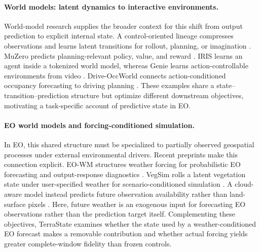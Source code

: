 \documentclass[letterpaper]{article} %
\begin{document}
\paragraph{World models: latent dynamics to interactive environments.}
World-model research supplies the broader context for this shift from output
prediction to explicit internal state. A control-oriented lineage compresses
observations and learns latent transitions for rollout, planning, or imagination
\cite{ha2018worldmodels,hafner2019planet,hafner2020dreamer}. MuZero predicts
planning-relevant policy, value, and reward \cite{schrittwieser2020muzero}. IRIS
learns an agent inside a tokenized world model, whereas Genie learns
action-controllable environments from video
\cite{micheli2023iris,bruce2024genie}. Drive-OccWorld connects
action-conditioned occupancy forecasting to driving planning
\cite{yang2025driveoccworld}. These examples share a
state--transition--prediction structure but optimize different downstream
objectives, motivating a task-specific account of predictive state in EO.

\paragraph{EO world models and forcing-conditioned simulation.}
In EO, this shared structure must be specialized to partially observed
geospatial processes under external environmental drivers. Recent preprints
make this connection explicit. EO-WM structures weather forcing for
probabilistic EO forecasting and output-response diagnostics
\cite{luo2026eowm}. VegSim rolls a latent vegetation state under user-specified
weather for scenario-conditioned simulation \cite{iele2026vegsim}. A
cloud-aware model instead predicts future observation availability rather than
land-surface pixels \cite{albughdadi2026observability}. Here, future weather is
an exogenous input for forecasting EO observations rather than the prediction
target itself. Complementing these objectives, TerraState examines whether the
state used by a weather-conditioned EO forecast makes a removable contribution
and whether actual forcing yields greater complete-window fidelity than frozen
controls.
\end{document}
